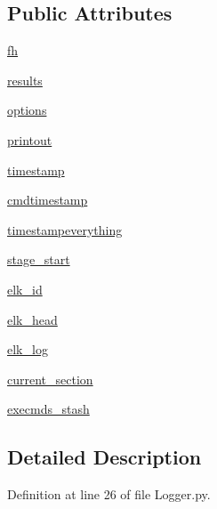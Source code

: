 \subsection*{Public Attributes}
\begin{DoxyCompactItemize}
\item 
\hyperlink{class_logger_1_1_logger_a68875fbff44820c122a69fee38bad238}{fh}
\item 
\hyperlink{class_logger_1_1_logger_accc7402a4ee718e807f3f60d850d2072}{results}
\item 
\hyperlink{class_logger_1_1_logger_a8e881dc46a69491fab52e8fca3d8dd59}{options}
\item 
\hyperlink{class_logger_1_1_logger_abd7bd77ec56ae98c25ff4596ae8ee0ea}{printout}
\item 
\hyperlink{class_logger_1_1_logger_af1d68b73fec8eebd0abeafa3bc8fd98b}{timestamp}
\item 
\hyperlink{class_logger_1_1_logger_a6424ebff90f965d7c6e4e8d7303bc3e2}{cmdtimestamp}
\item 
\hyperlink{class_logger_1_1_logger_a6012f50ab21e5ab3b89465a972b6a99d}{timestampeverything}
\item 
\hyperlink{class_logger_1_1_logger_a639adf5e0d4f73bdb942e9652903231f}{stage\-\_\-start}
\item 
\hyperlink{class_logger_1_1_logger_a14cdba9de890b4ddcd44f89919584663}{elk\-\_\-id}
\item 
\hyperlink{class_logger_1_1_logger_a6bfefa570074a540e3ec42c8a43a2583}{elk\-\_\-head}
\item 
\hyperlink{class_logger_1_1_logger_a0de302776caf63f84bb88e198dcd8b37}{elk\-\_\-log}
\item 
\hyperlink{class_logger_1_1_logger_a6cfd93e86a2b313df761184fa0661e0a}{current\-\_\-section}
\item 
\hyperlink{class_logger_1_1_logger_aa435d45f90a7c7b6595bbb5c14f9049d}{execmds\-\_\-stash}
\end{DoxyCompactItemize}


\subsection{Detailed Description}


Definition at line 26 of file Logger.\-py.



